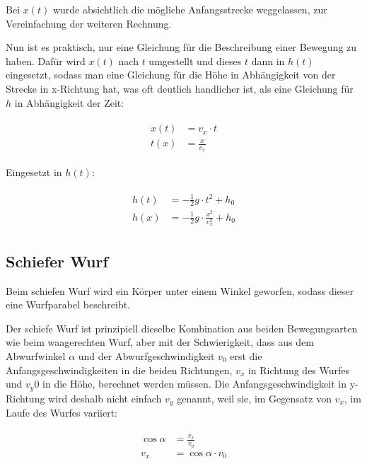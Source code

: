 \noindent Bei $x(t)$ wurde absichtlich die mögliche Anfangsstrecke weggelassen, zur Vereinfachung der weiteren Rechnung.

Nun ist es praktisch, nur eine Gleichung für die Beschreibung einer Bewegung zu haben. Dafür wird $x(t)$ nach $t$ umgestellt und dieses $t$ dann in $h(t)$  eingesetzt, sodass man eine Gleichung für die Höhe in Abhängigkeit von der Strecke in x-Richtung hat, was oft deutlich handlicher ist, als eine Gleichung für $h$ in Abhängigkeit der Zeit:

\begin{align}
\begin{split}
	x(t) &= v_x \cdot t \\
	t(x) &= \frac{x}{v_x}
\end{split}
\end{align}

\noindent Eingesetzt in $h(t)$:

\begin{align} \label{eq:waagerechtgesamt}
\begin{split}
	h(t) &= -\frac{1}{2}g \cdot t^2 + h_0 \\
	h(x) &= -\frac{1}{2}g \cdot \frac{x^2}{v_x^2} + h_0
\end{split}
\end{align}


\subsection{Schiefer Wurf}

Beim schiefen Wurf wird ein Körper unter einem Winkel geworfen, sodass dieser eine Wurfparabel beschreibt.

Der schiefe Wurf ist prinzipiell dieselbe Kombination aus beiden Bewegungsarten wie beim waagerechten Wurf, aber mit der Schwierigkeit, dass aus dem Abwurfwinkel $\alpha$ und der Abwurfgeschwindigkeit $v_0$ erst die Anfangsgeschwindigkeiten in die beiden Richtungen, $v_x$ in Richtung des Wurfes und $v_y0$ in die Höhe, berechnet werden müssen. Die Anfangsgeschwindigkeit in y-Richtung wird deshalb nicht einfach $v_y$ genannt, weil sie, im Gegensatz von $v_x$, im Laufe des Wurfes variiert:

\begin{align}
\begin{split}
	\cos{\alpha} &= \frac{v_x}{v_0} \\
	v_x &= \cos{\alpha} \cdot v_0
\end{split}
\end{align}

